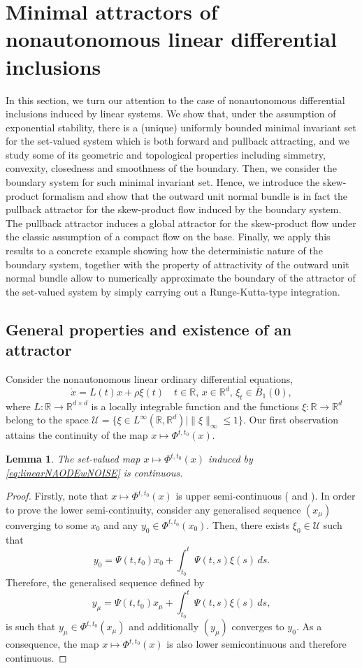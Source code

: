 \documentclass[reqno]{amsart}
\newtheorem{lem}[thm]{Lemma}
\theoremstyle{definition}
\numberwithin{equation}{section}
\newcommand{\R}{\mathbb{R}}
\newcommand{\U}{\mathcal{U}}
\newcommand\note[1]{\marginpar{\flushleft\sffamily\tiny #1}}
\begin{document}
\section{Minimal attractors of nonautonomous linear differential inclusions}
In this section, we turn our attention to the case of nonautonomous differential inclusions induced by linear systems. We show that, under the assumption of exponential stability, there is a (unique) uniformly bounded minimal invariant set for the set-valued system which is both forward and pullback attracting, and we study some of its geometric and topological properties including simmetry, convexity, closedness and smoothness of the boundary. Then, we consider the boundary system for such minimal invariant set. Hence, we introduce the skew-product formalism and show that the outward unit normal bundle is in fact the pullback attractor for the skew-product flow induced by the boundary system. The pullback attractor induces a global attractor for the skew-product flow under the classic assumption of a compact flow on the base. Finally, we apply this results to a concrete example showing how the deterministic nature of the boundary system, together with the property of attractivity of the outward unit normal bundle allow to numerically approximate the boundary of the attractor of the set-valued system by simply carrying out a Runge-Kutta-type integration.

\subsection{General properties and existence of an attractor}
Consider the nonautonomous linear ordinary differential equations, 
\begin{equation}\label{eq:linearNAODEwNOISE}
    \dot x =L(t)x+ \rho \xi(t)\quad t\in\R,\, x\in\R^d,\, \xi_t \in \overline B_1(0),
\end{equation}
where $ L:\R\to\R^{d\times d}$ is a locally integrable function and the functions $\xi:\R\to\R^d$ belong to the space $\U=\{\xi\in L^\infty(\R,\R^d)\mid \|\xi\|_\infty\le1\}$.  Our first observation attains the continuity of the map $x\mapsto \Phi^{t,t_0}(x)$.
\begin{lem}
    The set-valued map $x\mapsto \Phi^{t,t_0}(x)$ induced by \eqref{eq:linearNAODEwNOISE} is continuous.
\end{lem}
\begin{proof}
    Firstly, note that $x\mapsto \Phi^{t,t_0}(x)$ is upper semi-continuous %
(\cite[Corollary~7.1]{deimling2011multivalued}
 and \cite{aubin1984differential}). In order to prove the lower semi-continuity, consider any generalised sequence $(x_\mu)$ converging to some $x_0$ and any $y_0\in \Phi^{t,t_0}(x_0)$. Then, there exists $\xi_0\in\U$ such that 
\[
y_0=\Psi(t,t_0)x_0+\int_{t_0}^t\Psi(t,s)\xi(s)\,ds.
\]
Therefore, the generalised sequence defined by
\[
y_\mu=\Psi(t,t_0)x_\mu+\int_{t_0}^t\Psi(t,s)\xi(s)\,ds,
\]
is such that $y_\mu\in \Phi^{t,t_0}(x_\mu)$ and additionally  $(y_\mu)$ converges to  $y_0$. As a consequence, the map $x\mapsto \Phi^{t,t_0}(x)$ is also lower semicontinuous and therefore continuous.
\end{proof}
\end{document}
